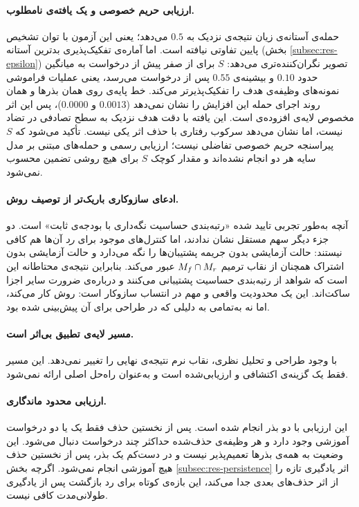 \paragraph{ارزیابی حریم خصوصی و یک یافته‌ی نامطلوب.} حمله‌ی آستانه‌ی زیان نتیجه‌ی نزدیک به $0.5$ می‌دهد؛ یعنی این آزمون با توان تشخیص پایین تفاوتی نیافته است. اما آماره‌ی تفکیک‌پذیری بدترین آستانه (بخش \ref{subsec:res-epsilon}) تصویر نگران‌کننده‌تری می‌دهد: $S$ برای  از صفر پیش از درخواست به میانگین حدود $0.10$ و بیشینه‌ی $0.55$ پس از درخواست می‌رسد، یعنی عملیات فراموشی نمونه‌های وظیفه‌ی هدف را تفکیک‌پذیرتر می‌کند. خط پایه‌ی  روی همان بذرها و همان روند اجرای حمله این افزایش را نشان نمی‌دهد ($0.0013$ و $0.0000$)، پس این اثر مخصوص لایه‌ی افزوده‌ی  است. این یافته با دقت هدف نزدیک به سطح تصادفی در تضاد نیست، اما نشان می‌دهد سرکوب رفتاری با حذف اثر یکی نیست. تأکید می‌شود که $S$ پیراسنجه حریم خصوصی تفاضلی نیست؛ ارزیابی رسمی و حمله‌های مبتنی بر مدل سایه \cite{carlini2022membership} هر دو انجام نشده‌اند و مقدار کوچک $S$ برای هیچ روشی تضمین محسوب نمی‌شود.

\paragraph{ادعای سازوکاری باریک‌تر از توصیف روش.} آنچه به‌طور تجربی تایید شده «رتبه‌بندی حساسیت نگه‌داری با بودجه‌ی ثابت» است. دو جزء دیگر سهم مستقل نشان ندادند، اما کنترل‌های موجود برای \emph{رد} آن‌ها هم کافی نیستند: حالت آزمایشی بدون جریمه پشتیبان‌ها را نگه می‌دارد و حالت آزمایشی بدون اشتراک همچنان از نقاب ترمیم $M_f\cap M_r$ عبور می‌کند. بنابراین نتیجه‌ی محتاطانه این است که شواهد از رتبه‌بندی حساسیت پشتیبانی می‌کنند و درباره‌ی ضرورت سایر اجزا ساکت‌اند. این یک محدودیت واقعی و مهم در انتساب سازوکار است: روش کار می‌کند، اما نه به‌تمامی به دلیلی که در طراحی برای آن پیش‌بینی شده بود.

\paragraph{مسیر لایه‌ی تطبیق بی‌اثر است.} با وجود طراحی و تحلیل نظری، نقاب نرم نتیجه‌ی نهایی را تغییر نمی‌دهد. این مسیر فقط یک گزینه‌ی اکتشافی و ارزیابی‌شده است و به‌عنوان راه‌حل اصلی ارائه نمی‌شود.

\paragraph{ارزیابی محدود ماندگاری.} این ارزیابی با دو بذر انجام شده است. پس از نخستین حذف فقط یک یا دو درخواست آموزشی وجود دارد و هر وظیفه‌ی حذف‌شده حداکثر چند درخواست دنبال می‌شود. این وضعیت به همه‌ی بذرها تعمیم‌پذیر نیست و در دست‌کم یک بذر، پس از نخستین حذف هیچ آموزشی انجام نمی‌شود. اگرچه بخش \ref{subsec:res-persistence} اثر یادگیری تازه را از اثر حذف‌های بعدی جدا می‌کند، این بازه‌ی کوتاه برای رد بازگشت پس از یادگیری طولانی‌مدت کافی نیست.

